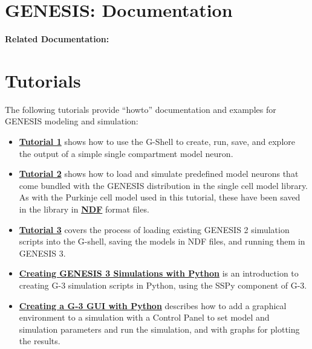 \documentclass[12pt]{article}
\begin{document}
\section*{GENESIS: Documentation}

{\bf Related Documentation:}

\section*{Tutorials}

The following tutorials provide ``howto'' documentation and examples for
GENESIS modeling and simulation:

\begin{itemize}

   \item[]\href{../tutorial1/tutorial1.html}
          {\bf Tutorial 1} shows how to use the G-Shell to create, run,
          save, and explore the output of a simple single compartment model neuron.

   \item[]\href{../tutorial2/tutorial2.html}
          {\bf Tutorial 2} shows how to load and simulate predefined model
    neurons that come bundled with the GENESIS distribution in the single
    cell model library. As with the Purkinje cell model used in this
    tutorial, these have been saved in the library in
    \href{../ndf-file-format/ndf-file-format.tex}{\bf NDF} format files.

   \item[]\href{../tutorial3/tutorial3.html}
          {\bf Tutorial 3} covers the process of loading existing GENESIS 2
   simulation scripts into the G-shell, saving the models in NDF files, and
   running them in GENESIS 3. 

   \item[]\href{../tutorial-python-scripting/tutorial-python-scripting.html}
          {\bf Creating GENESIS 3 Simulations with Python}
    is an introduction to creating G-3 simulation
    scripts in Python, using the SSPy component of G-3.

   \item[]\href{../tutorial-python-gui/tutorial-python-gui.html}
          {\bf Creating a G-3 GUI with Python}
    describes how to add a graphical environment to a simulation with a Control Panel to
    set model and simulation parameters and run the simulation, and with graphs for plotting
    the  results.


\end{itemize}
\end{document}
